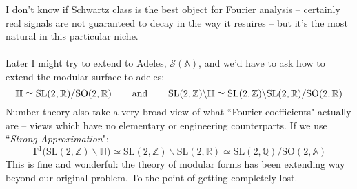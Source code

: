 \documentclass[12pt]{article}
\begin{document}
I don't know if Schwartz class is the best object for Fourier analysis -- certainly real signals are not guaranteed to decay in the way it resuires -- but it's the most natural in this particular niche.  \\ \\
Later I might try to extend to Adeles, $\mathcal{S}(\mathbb{A})$, and we'd have to ask how to extend the modular surface to adeles:
$$ \mathbb{H}\simeq \text{SL}(2, \mathbb{R})/\text{SO}(2, \mathbb{R}) 
\hspace{0.25in}\text{ and }\hspace{0.25in}
\text{SL}(2, \mathbb{Z})  \backslash \mathbb{H}\simeq \text{SL}(2, \mathbb{Z}) \backslash \text{SL}(2, \mathbb{R})/\text{SO}(2, \mathbb{R})$$
Number theory also take a very broad view of what ``Fourier coefficients" actually are -- views which have no elementary or engineering counterparts.  If we use ``\textit{Strong Approximation}":
$$ \text{T}^1 \big( \text{SL}(2, \mathbb{Z} ) \backslash \mathbb{H} \big) \simeq \text{SL}(2, \mathbb{Z})   \backslash \text{SL}(2, \mathbb{R})  
\simeq \text{SL}(2, \mathbb{Q})/\text{SO}(2, \mathbb{A})   $$
This is fine and wonderful: the theory of modular forms has been extending way beyond our original problem.  To the point of getting completely lost.

\newpage
\end{document}

